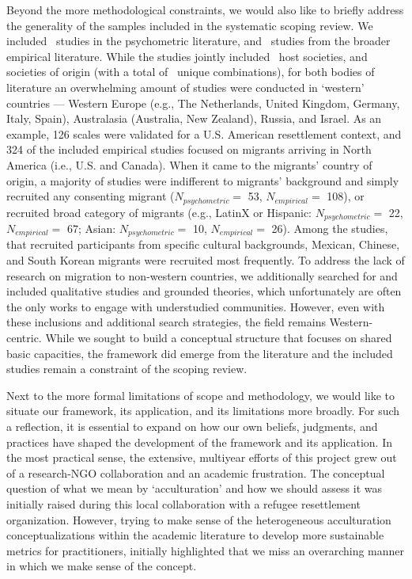 \documentclass[man, 12pt, a4paper, mask]{apa7}
\begin{document}
Beyond the more methodological constraints, we would also like to briefly address the generality of the samples included in the systematic scoping review. We included \nMeth \, studies in the psychometric literature, and \nEmp \, studies from the broader empirical literature. While the studies jointly included \nCultureHost \, host societies, and \nCultureOrigin \, societies of origin (with a total of \nCultureCombs \, unique combinations), for both bodies of literature an overwhelming amount of studies were conducted in `western' countries --- Western Europe (e.g., The Netherlands, United Kingdom, Germany, Italy, Spain), Australasia (Australia, New Zealand), Russia, and Israel. As an example, 126 scales were validated for a U.S. American resettlement context, and 324 of the included empirical studies focused on migrants arriving in North America (i.e., U.S. and Canada). When it came to the migrants' country of origin, a majority of studies were indifferent to migrants' background and simply recruited any consenting migrant ($N_{psychometric}=$ 53, $N_{empirical}=$ 108), or recruited broad category of migrants (e.g., LatinX or Hispanic: $N_{psychometric}=$ 22, $N_{empirical}=$ 67; Asian: $N_{psychometric}=$ 10, $N_{empirical}=$ 26). Among the studies, that recruited participants from specific cultural backgrounds, Mexican, Chinese, and South Korean migrants were recruited most frequently. To address the lack of research on migration to non-western countries, we additionally searched for and included qualitative studies and grounded theories, which unfortunately are often the only works to engage with understudied communities. However, even with these inclusions and additional search strategies, the field remains Western-centric. While we sought to build a conceptual structure that focuses on shared basic capacities, the framework did emerge from the literature and the included studies remain a constraint of the scoping review.

Next to the more formal limitations of scope and methodology, we would like to situate our framework, its application, and its limitations more broadly. For such a reflection, it is essential to expand on how our own beliefs, judgments, and practices have shaped the development of the framework and its application. In the most practical sense, the extensive, multiyear efforts of this project grew out of a research-NGO collaboration and an academic frustration. The conceptual question of what we mean by `acculturation' and how we should assess it was initially raised during this local collaboration with a refugee resettlement organization. However, trying to make sense of the heterogeneous acculturation conceptualizations within the academic literature to develop more sustainable metrics for practitioners, initially highlighted that we miss an overarching manner in which we make sense of the concept. 
\end{document}
